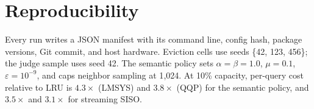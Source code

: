\documentclass{article}
\begin{document}
\section{Reproducibility}
Every run writes a JSON manifest with its command line, config hash, package
versions, Git commit, and host hardware. Eviction cells use seeds
\{42, 123, 456\}; the judge sample uses seed 42. The semantic policy sets
$\alpha=\beta=1.0$, $\mu=0.1$, $\varepsilon=10^{-9}$, and caps neighbor
sampling at 1{,}024. At 10\% capacity, per-query cost relative to LRU is
$4.3\times$ (LMSYS) and $3.8\times$ (QQP) for the semantic policy, and
$3.5\times$ and $3.1\times$ for streaming SISO.
\end{document}

